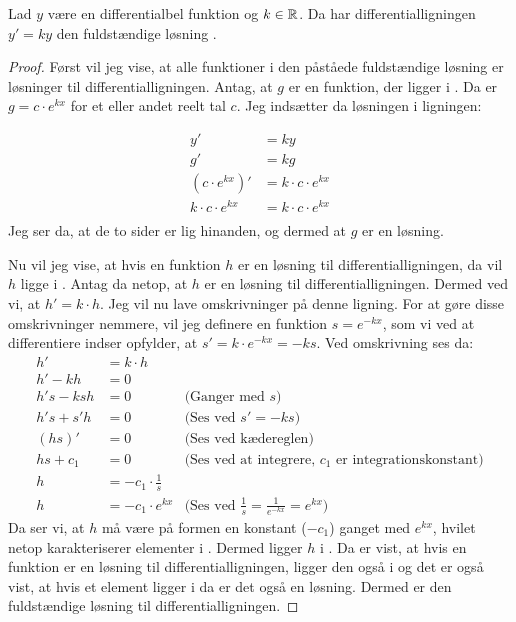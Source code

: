 \begin{thm}\label{thm:y'=k*y}
Lad $y$ være en differentialbel funktion og $k\in \mathbb{R}$. Da har  differentialligningen $y' = ky$ den fuldstændige løsning \LosEks.
\end{thm}
\begin{proof}
Først vil jeg vise, at alle funktioner i den påståede fuldstændige løsning er løsninger til differentialligningen.
Antag, at $g$ er en funktion, der ligger i \LosEks .
Da er $g=c\cdot e^{kx}$ for et eller andet reelt tal $c$.
Jeg indsætter da løsningen i ligningen: 

\begin{align*}
y' &= ky\\
g' &= kg\\
(c\cdot e^{kx})' &= k\cdot c\cdot e^{kx}\\
k\cdot c\cdot e^{kx} &= k\cdot c\cdot e^{kx}\\
\end{align*}
Jeg ser da, at de to sider er lig hinanden, og dermed at $g$ er en løsning. 

Nu vil jeg vise, at hvis en funktion $h$ er en løsning til differentialligningen, da vil $h$ ligge i \LosEks.
Antag da netop, at $h$ er en løsning til differentialligningen. 
Dermed ved vi, at $h'=k\cdot h$.
Jeg vil nu lave omskrivninger på denne ligning. 
For at gøre disse omskrivninger nemmere, vil jeg definere en funktion $s=e^{-kx}$, som vi ved at differentiere indser opfylder, at $s'=k \cdot e^{-kx} = -ks$.
Ved omskrivning ses da:
\begin{align*}
h'&=k\cdot h \\
h'-kh &= 0\\
h's-ksh&=0 		& \text{(Ganger med }s\text{)}\\
h's+s'h&=0		& \text{(Ses ved $s'=-ks$)}\\
(hs)'&=0		&\text{(Ses ved kædereglen)}\\
hs+c_1 &= 0		&\text{(Ses ved at integrere, $c_1$ er integrationskonstant)}\\
h&= -c_1 \cdot \frac{1}{s}\\
h&= -c_1 \cdot e^{kx} &\text{(Ses ved $\frac{1}{s}=\frac{1}{e^{-kx}} = e^{kx}$)}
\end{align*}
Da ser vi, at $h$ må være på formen en konstant ($-c_1$) ganget med $e^{kx}$, hvilet netop karakteriserer elementer i \LosEks. 
Dermed ligger $h$ i \LosEks.
Da er vist, at hvis en funktion er en løsning til differentialligningen, ligger den også i \LosEks og det er også vist, at hvis et element ligger i \LosEks\text{,} da er det også en løsning. 
Dermed er \LosEks\text{} den fuldstændige løsning til differentialligningen. 
\end{proof}
